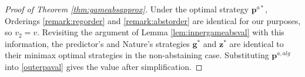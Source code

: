 \documentclass{article}[12pt]
\theoremstyle{named}
\newcommand{\vg}{\mathbf{g}}    %
\newcommand{\vp}{\mathbf{p}}
\newcommand{\vz}{\mathbf{z}}
\newcommand{\abs}[1]{\left| #1 \right|}
\newcommand{\lrp}[1]{\left(#1\right)}
\begin{document}
\begin{proof}[Proof of Theorem \ref{thm:gameabsapprox}]

%

Under the optimal strategy $\vp^{a*}$, 
Orderings \ref{remark:regorder} and \ref{remark:abstorder} are identical for our purposes, so $v_2 = v$. 
Revisiting the argument of Lemma \ref{lem:innergameabsval} with this information, 
the predictor's and Nature's strategies $\vg^*$ and $\vz^*$ 
are identical to their minimax optimal strategies in the non-abstaining case. 
Substituting $\vp^{a,alg}$ into \eqref{outerpaval} gives the value after simplification.
\end{proof}
\end{document}
